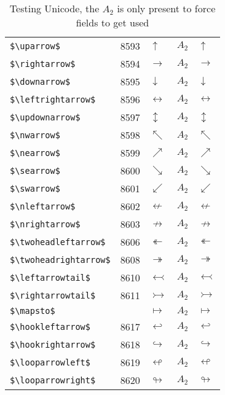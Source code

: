 \documentclass{article}
\begin{document}
\begin{table}
\begin{center}
\begin{tabular}{llll}
 \verb#$\uparrow$#           & 8593 & $\uparrow$           & $A_2\quad \uparrow$\\
 \verb#$\rightarrow$#        & 8594 & $\rightarrow$        & $A_2\quad \rightarrow$\\
 \verb#$\downarrow$#         & 8595 & $\downarrow$         & $A_2\quad \downarrow$\\
 \verb#$\leftrightarrow$#    & 8596 & $\leftrightarrow$    & $A_2\quad \leftrightarrow$\\
 \verb#$\updownarrow$#       & 8597 & $\updownarrow$       & $A_2\quad \updownarrow$\\
 \verb#$\nwarrow$#           & 8598 & $\nwarrow$           & $A_2\quad \nwarrow$\\
 \verb#$\nearrow$#           & 8599 & $\nearrow$           & $A_2\quad \nearrow$\\
 \verb#$\searrow$#           & 8600 & $\searrow$           & $A_2\quad \searrow$\\
 \verb#$\swarrow$#           & 8601 & $\swarrow$           & $A_2\quad \swarrow$\\
 \verb#$\nleftarrow$#        & 8602 & $\nleftarrow$        & $A_2\quad \nleftarrow$\\
 \verb#$\nrightarrow$#       & 8603 & $\nrightarrow$       & $A_2\quad \nrightarrow$\\
 \verb#$\twoheadleftarrow$#  & 8606 & $\twoheadleftarrow$  & $A_2\quad \twoheadleftarrow$\\
 \verb#$\twoheadrightarrow$# & 8608 & $\twoheadrightarrow$ & $A_2\quad \twoheadrightarrow$\\
 \verb#$\leftarrowtail$#     & 8610 & $\leftarrowtail$     & $A_2\quad \leftarrowtail$\\
 \verb#$\rightarrowtail$#    & 8611 & $\rightarrowtail$    & $A_2\quad \rightarrowtail$\\
 \verb#$\mapsto$#            &      & $\mapsto$            & $A_2\quad \mapsto$\\
 \verb#$\hookleftarrow$#     & 8617 & $\hookleftarrow$     & $A_2\quad \hookleftarrow$\\
 \verb#$\hookrightarrow$#    & 8618 & $\hookrightarrow$    & $A_2\quad \hookrightarrow$\\
 \verb#$\looparrowleft$#     & 8619 & $\looparrowleft$     & $A_2\quad \looparrowleft$\\
 \verb#$\looparrowright$#    & 8620 & $\looparrowright$    & $A_2\quad \looparrowright$\\
\end{tabular}
\end{center}
\caption{Testing Unicode, the $A_2$ is only present to force fields to get used}
\end{table}
\end{document}
